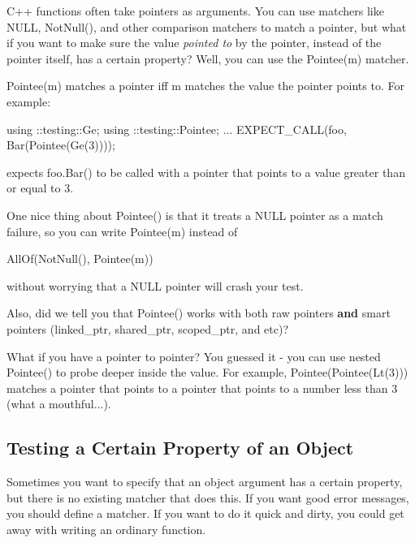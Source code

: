 C++ functions often take pointers as arguments. You can use matchers like {\ttfamily N\+U\+LL}, {\ttfamily Not\+Null()}, and other comparison matchers to match a pointer, but what if you want to make sure the value {\itshape pointed to} by the pointer, instead of the pointer itself, has a certain property? Well, you can use the {\ttfamily Pointee(m)} matcher.

{\ttfamily Pointee(m)} matches a pointer iff {\ttfamily m} matches the value the pointer points to. For example\+:


\begin{DoxyCode}
using ::testing::Ge;
using ::testing::Pointee;
...
  EXPECT\_CALL(foo, Bar(Pointee(Ge(3))));
\end{DoxyCode}


expects {\ttfamily foo.\+Bar()} to be called with a pointer that points to a value greater than or equal to 3.

One nice thing about {\ttfamily Pointee()} is that it treats a {\ttfamily N\+U\+LL} pointer as a match failure, so you can write {\ttfamily Pointee(m)} instead of


\begin{DoxyCode}
AllOf(NotNull(), Pointee(m))
\end{DoxyCode}


without worrying that a {\ttfamily N\+U\+LL} pointer will crash your test.

Also, did we tell you that {\ttfamily Pointee()} works with both raw pointers {\bfseries and} smart pointers ({\ttfamily linked\+\_\+ptr}, {\ttfamily shared\+\_\+ptr}, {\ttfamily scoped\+\_\+ptr}, and etc)?

What if you have a pointer to pointer? You guessed it -\/ you can use nested {\ttfamily Pointee()} to probe deeper inside the value. For example, {\ttfamily Pointee(Pointee(\+Lt(3)))} matches a pointer that points to a pointer that points to a number less than 3 (what a mouthful...).

\subsection*{Testing a Certain Property of an Object}

Sometimes you want to specify that an object argument has a certain property, but there is no existing matcher that does this. If you want good error messages, you should define a matcher. If you want to do it quick and dirty, you could get away with writing an ordinary function.

